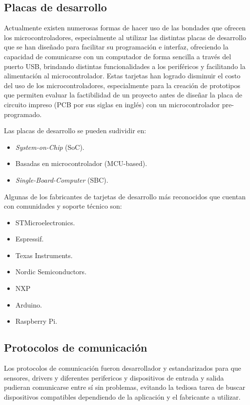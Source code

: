 \subsection{Placas de desarrollo}

Actualmente existen numerosas formas de hacer uso de las bondades que ofrecen los microcontroladores, especialmente al utilizar las distintas placas de desarrollo que se han diseñado para facilitar su programación e interfaz, ofreciendo la capacidad de comunicarse con un computador de forma sencilla a través del puerto USB, brindando distintas funcionalidades a los periféricos y facilitando la alimentación al microcontrolador. Estas tarjetas han logrado disminuir el costo del uso de los microcontroladores, especialmente para la creación de prototipos que permiten evaluar la factibilidad de un proyecto antes de diseñar la placa de circuito impreso (PCB por sus siglas en inglés) con un microcontrolador pre-programado.

Las placas de desarrollo se pueden sudividir en:


\begin{itemize}
    \item \textit{System-on-Chip} (SoC).
    \item Basadas en microcontrolador (MCU-based).
    \item \textit{Single-Board-Computer} (SBC).
\end{itemize}
Algunas de los fabricantes de tarjetas de desarrollo más reconocidos que cuentan con comunidades y soporte técnico son:

\begin{itemize}
    \item STMicroelectronics.
    \item Espressif.
    \item Texas Instruments.
    \item Nordic Semiconductors.
    \item NXP
    \item Arduino.
    \item Raspberry Pi.

\end{itemize}

\subsection{Protocolos de comunicación}

Los protocolos de comunicación fueron desarrollador y estandarizados para que sensores, drivers y diferentes perifericos y dispositivos de entrada y salida pudieran comunicarse entre sí sin problemas, evitando la tediosa tarea de buscar dispositivos compatibles dependiendo de la aplicación y el fabricante a utilizar. 


